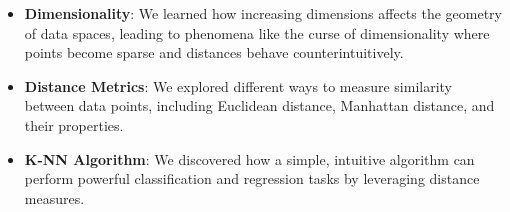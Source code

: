 \documentclass[12pt]{article}
\begin{document}
\begin{itemize}
    \item \textbf{Dimensionality}: We learned how increasing dimensions affects the geometry of data spaces, leading to phenomena like the curse of dimensionality where points become sparse and distances behave counterintuitively.
    
    \item \textbf{Distance Metrics}: We explored different ways to measure similarity between data points, including Euclidean distance, Manhattan distance, and their properties.
    
    \item \textbf{K-NN Algorithm}: We discovered how a simple, intuitive algorithm can perform powerful classification and regression tasks by leveraging distance measures.
\end{itemize}
\end{document}
